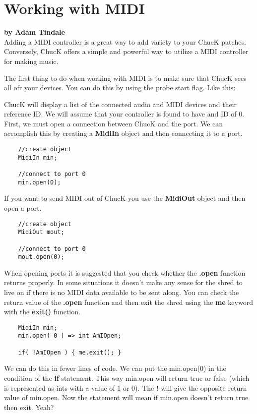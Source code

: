 \section{Working with MIDI}
\textbf{by Adam Tindale}\\

Adding a MIDI controller is a great way to add variety to your ChucK patches. Conversely, ChucK offers a simple and powerful way to utilize a MIDI controller for making music.  

The first thing to do when working with MIDI is to make sure that ChucK sees all ofr your devices. You can do this by using the \doubledash probe start flag. Like this:


ChucK will display a list of the connected audio and MIDI devices and their reference ID. We will assume that your controller is found to have and ID of 0. First, we must open a connection between ChucK and the port. We can accomplish this by creating a {\bf MidiIn} object and then connecting it to a port. 

\begin{verbatim}
    //create object
    MidiIn min;

    //connect to port 0
    min.open(0);
\end{verbatim}

If you want to send MIDI out of ChucK you use the {\bf MidiOut} object and then open a port. 

\begin{verbatim}
    //create object
    MidiOut mout;

    //connect to port 0
    mout.open(0);
\end{verbatim}

When opening ports it is suggested that you check whether the {\bf .open} function returns properly. In some situations it doesn't make any sense for the shred to live on if there is no MIDI data available to be sent along. You can check the return value of the {\bf .open} function and then exit the shred using the {\bf me} keyword with the {\bf exit()} function.

\begin{verbatim}
    MidiIn min;
    min.open( 0 ) => int AmIOpen;

    if( !AmIOpen ) { me.exit(); }
\end{verbatim}

We can do this in fewer lines of code. We can put the min.open(0) in the condition of the {\bf if} statement. This way min.open will return true or false (which is represented as ints with a value of 1 or 0). The {\bf !} will give the opposite return value of min.open. Now the statement will mean if min.open doesn't return true then exit. Yeah?

